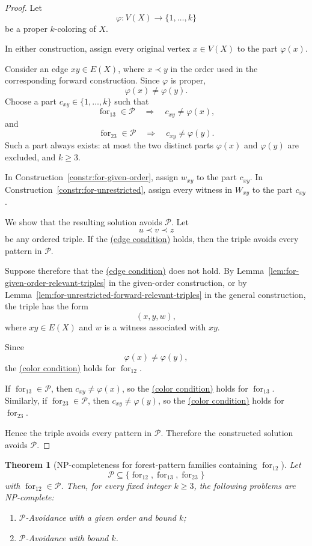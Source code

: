 \documentclass[12pt]{article}
\theoremstyle{plain}
\newtheorem{theorem}{Theorem}[section]
\theoremstyle{definition}
\theoremstyle{remark}
\theoremstyle{definition}
\newcommand{\edgecondition}{%
  \hyperref[def:avoid:cond:edge]{(edge condition)}\xspace
}
\newcommand{\colorcondition}{%
  \hyperref[def:avoid:cond:color]{(color condition)}\xspace
}
\newcommand{\forlabel}{\mathrm{for}}
\DeclareRobustCommand{\forparam}[1]{%
  \ensuremath{\mathop{\forlabel}\nolimits_{#1}}%
}
\begin{document}
\begin{proof}
Let
\[
\varphi:V(X)\to\{1,\dots,k\}
\]
be a proper \(k\)-coloring of \(X\).

In either construction, assign every original vertex \(x\in V(X)\)
to the part \(\varphi(x)\).

Consider an edge \(xy\in E(X)\), where \(x\prec y\) in the order used
in the corresponding forward construction. Since \(\varphi\) is proper,
\[
\varphi(x)\neq\varphi(y).
\]
Choose a part \(c_{xy}\in\{1,\dots,k\}\) such that
\[
\forparam{13}\in\mathcal P
\quad\Longrightarrow\quad
c_{xy}\neq\varphi(x),
\]
and
\[
\forparam{23}\in\mathcal P
\quad\Longrightarrow\quad
c_{xy}\neq\varphi(y).
\]
Such a part always exists: at most the two distinct parts
\(\varphi(x)\) and \(\varphi(y)\) are excluded, and \(k\ge3\).

In Construction~\ref{constr:for-given-order}, assign \(w_{xy}\) to
the part \(c_{xy}\). In
Construction~\ref{constr:for-unrestricted}, assign every witness in
\(W_{xy}\) to the part \(c_{xy}\).

We show that the resulting solution avoids \(\mathcal P\).
Let
\[
u\prec v\prec z
\]
be any ordered triple. If the \edgecondition{} holds, then the triple
avoids every pattern in \(\mathcal P\).

Suppose therefore that the \edgecondition{} does not hold. By
Lemma~\ref{lem:for-given-order-relevant-triples} in the given-order
construction, or by
Lemma~\ref{lem:for-unrestricted-forward-relevant-triples} in the
general construction, the triple has the form
\[
(x,y,w),
\]
where \(xy\in E(X)\) and \(w\) is a witness associated with \(xy\).

Since
\[
\varphi(x)\neq\varphi(y),
\]
the \colorcondition{} holds for \(\forparam{12}\).

If \(\forparam{13}\in\mathcal P\), then
\(c_{xy}\neq\varphi(x)\), so the \colorcondition{} holds for
\(\forparam{13}\). Similarly, if
\(\forparam{23}\in\mathcal P\), then
\(c_{xy}\neq\varphi(y)\), so the \colorcondition{} holds for
\(\forparam{23}\).

Hence the triple avoids every pattern in \(\mathcal P\).
Therefore the constructed solution avoids \(\mathcal P\).
\end{proof}






\begin{theorem}[NP-completeness for forest-pattern families containing
\(\forparam{12}\)]
\label{thm:for12-containing-families-np-complete}
Let
\[
\mathcal P\subseteq
\{\forparam{12},\forparam{13},\forparam{23}\}
\]
with \(\forparam{12}\in\mathcal P\).
Then, for every fixed integer \(k\ge 3\), the following problems are
NP-complete:
\begin{enumerate}
    \item \(\mathcal P\)-Avoidance with a given order and bound \(k\);
    \item \(\mathcal P\)-Avoidance with bound \(k\).
\end{enumerate}
\end{theorem}
\end{document}
